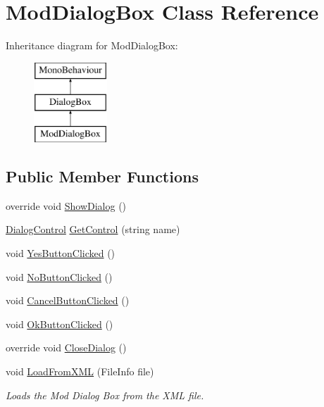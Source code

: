 \hypertarget{class_mod_dialog_box}{}\section{Mod\+Dialog\+Box Class Reference}
\label{class_mod_dialog_box}
Inheritance diagram for Mod\+Dialog\+Box\+:\begin{figure}[H]
\begin{center}
\leavevmode
\includegraphics[height=3.000000cm]{class_mod_dialog_box}
\end{center}
\end{figure}
\subsection*{Public Member Functions}
\begin{DoxyCompactItemize}
\item 
override void \hyperlink{class_mod_dialog_box_aaeae20aeb93688e1acc1cce9e9965c48}{Show\+Dialog} ()
\item 
\hyperlink{class_dialog_control}{Dialog\+Control} \hyperlink{class_mod_dialog_box_a2a5dae99d27fad2ba666e6833622688c}{Get\+Control} (string name)
\item 
void \hyperlink{class_mod_dialog_box_ab00d02799425cfe3f59bbb156956acbc}{Yes\+Button\+Clicked} ()
\item 
void \hyperlink{class_mod_dialog_box_ab8285fca595e4a7d5dd6a0e3334dce12}{No\+Button\+Clicked} ()
\item 
void \hyperlink{class_mod_dialog_box_ac69e09264e0a4f6bef17266cc851b57a}{Cancel\+Button\+Clicked} ()
\item 
void \hyperlink{class_mod_dialog_box_a470352346cc50a60a024b20ea4d525d2}{Ok\+Button\+Clicked} ()
\item 
override void \hyperlink{class_mod_dialog_box_ad5168655ce50919439a1a6f2c0dcb207}{Close\+Dialog} ()
\item 
void \hyperlink{class_mod_dialog_box_aa8f270c2e58f5e79e1650bcabc9c174f}{Load\+From\+X\+ML} (File\+Info file)
\begin{DoxyCompactList}\small\item\em Loads the Mod Dialog Box from the X\+ML file. \end{DoxyCompactList}\end{DoxyCompactItemize}
